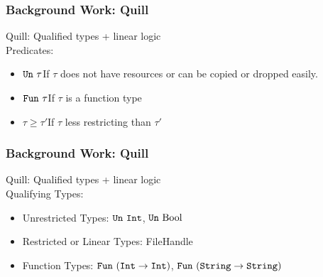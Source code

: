 


\begin{frame}
  \frametitle{Background Work: Quill}
  Quill\citep{morris_best_2016}: Qualified types + linear logic\\
  Predicates:
  \begin{itemize}
  \item $\texttt{Un}\ \tau$\quad If $\tau$ does not have resources
    or can be copied or dropped easily.
  \item $\texttt{Fun}\ \tau$\quad If $\tau$ is a function type
  \item $\tau \geq \tau'$\quad If $\tau$ less restricting than $\tau'$
  \end{itemize}
\end{frame}



\begin{frame}[fragile, c]
  \frametitle{Background Work: Quill}
  Quill\citep{morris_best_2016}: Qualified types + linear logic\\
  Qualifying Types:
  \begin{itemize}
  \item Unrestricted Types: $\texttt{Un}\ \texttt{Int}$, $\texttt{Un}\ \text{Bool}$
  \item Restricted or Linear Types: FileHandle
  \item Function Types: $\texttt{Fun}\ (\texttt{Int} \rightarrow \texttt{Int})$,
    $\texttt{Fun}\ (\texttt{String} \rightarrow \texttt{String})$
  \end{itemize}
\end{frame}


